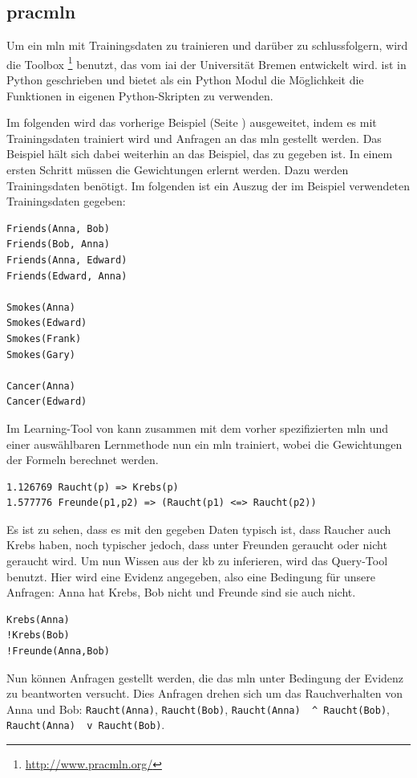 \subsection{pracmln}
\label{subsec:pracmln}
Um ein \gls{mln} mit Trainingsdaten zu trainieren und darüber zu schlussfolgern, wird die Toolbox \pracmln\footnote{\url{http://www.pracmln.org/}} benutzt, das vom \gls{iai} der Universität Bremen entwickelt wird. \pracmln ist in Python geschrieben und bietet als ein Python Modul die Möglichkeit die Funktionen in eigenen Python-Skripten zu verwenden. \par 
Im folgenden wird das vorherige Beispiel (Seite \pageref{mlnexample}) ausgeweitet, indem es mit Trainingsdaten trainiert wird und Anfragen an das \gls{mln} gestellt werden. Das Beispiel hält sich dabei weiterhin an das Beispiel, das zu \pracmln gegeben ist.  \newline
In einem ersten Schritt müssen die Gewichtungen erlernt werden. Dazu werden Trainingsdaten benötigt. Im folgenden ist ein Auszug der im Beispiel verwendeten Trainingsdaten gegeben: 
\begin{lstlisting}[backgroundcolor=\color{backcolour}]
Friends(Anna, Bob)
Friends(Bob, Anna)
Friends(Anna, Edward)
Friends(Edward, Anna)  

Smokes(Anna)
Smokes(Edward)
Smokes(Frank)
Smokes(Gary)

Cancer(Anna)
Cancer(Edward)
\end{lstlisting}  
Im Learning-Tool von \pracmln kann zusammen mit dem vorher spezifizierten \gls{mln} und einer auswählbaren Lernmethode nun ein \gls{mln} trainiert, wobei die Gewichtungen der Formeln berechnet werden.     
\begin{lstlisting}[backgroundcolor=\color{backcolour}]
1.126769 Raucht(p) => Krebs(p)
1.577776 Freunde(p1,p2) => (Raucht(p1) <=> Raucht(p2))
\end{lstlisting}  
Es ist zu sehen, dass es mit den gegeben Daten typisch ist, dass Raucher auch Krebs haben, noch typischer jedoch, dass unter Freunden geraucht oder nicht geraucht wird.\newline
Um nun Wissen aus der \gls{kb} zu inferieren, wird das Query-Tool benutzt. Hier wird eine Evidenz angegeben, also eine Bedingung für unsere Anfragen: Anna hat Krebs, Bob nicht und Freunde sind sie auch nicht. 
\begin{lstlisting}[backgroundcolor=\color{backcolour}]
Krebs(Anna)
!Krebs(Bob)
!Freunde(Anna,Bob)
\end{lstlisting} 
Nun können Anfragen gestellt werden, die das \gls{mln} unter Bedingung der Evidenz zu beantworten versucht. Dies Anfragen drehen sich um das Rauchverhalten von Anna und Bob: \lstinline[breaklines=true]{Raucht(Anna)}, \lstinline[breaklines=true]{Raucht(Bob)}, \lstinline[breaklines=true]{Raucht(Anna)  ^ Raucht(Bob)}, \lstinline[breaklines=true]{Raucht(Anna)  v Raucht(Bob)}. \newline
